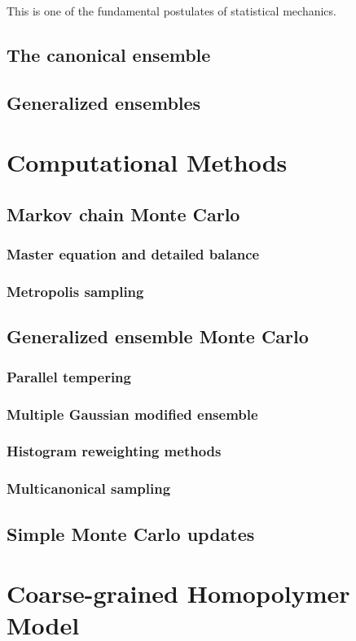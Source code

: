 \documentclass[12pt]{report}
\begin{document}
 This is one of the fundamental postulates of statistical mechanics.
\section{The canonical ensemble}
\section{Generalized ensembles}

\chapter{Computational Methods}
\section{Markov chain Monte Carlo}
\subsection{Master equation and detailed balance}
\subsection{Metropolis sampling}
\section{Generalized ensemble Monte Carlo}
\subsection{Parallel tempering}
\subsection{Multiple Gaussian modified ensemble}
\subsection{Histogram reweighting methods}
\subsection{Multicanonical sampling}
\section{Simple Monte Carlo updates}

\chapter{Coarse-grained Homopolymer Model}
\end{document}
